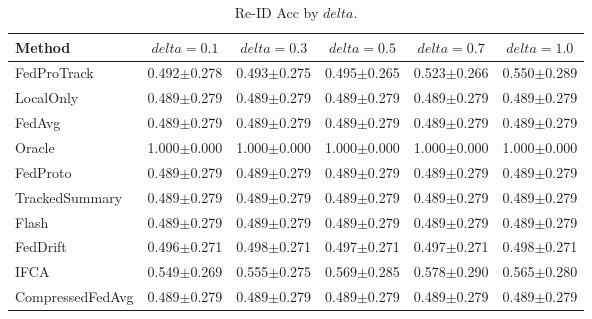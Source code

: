 \begin{table}[t]
\centering
\caption{Re-ID Acc by $delta$.}
\label{tab:delta_concept_re_id_accuracy}
\begin{tabular}{lccccc}
\toprule
Method & $delta=0.1$ & $delta=0.3$ & $delta=0.5$ & $delta=0.7$ & $delta=1.0$ \\
\midrule
FedProTrack & 0.492$\pm$0.278 & 0.493$\pm$0.275 & 0.495$\pm$0.265 & 0.523$\pm$0.266 & 0.550$\pm$0.289 \\
LocalOnly & 0.489$\pm$0.279 & 0.489$\pm$0.279 & 0.489$\pm$0.279 & 0.489$\pm$0.279 & 0.489$\pm$0.279 \\
FedAvg & 0.489$\pm$0.279 & 0.489$\pm$0.279 & 0.489$\pm$0.279 & 0.489$\pm$0.279 & 0.489$\pm$0.279 \\
Oracle & 1.000$\pm$0.000 & 1.000$\pm$0.000 & 1.000$\pm$0.000 & 1.000$\pm$0.000 & 1.000$\pm$0.000 \\
FedProto & 0.489$\pm$0.279 & 0.489$\pm$0.279 & 0.489$\pm$0.279 & 0.489$\pm$0.279 & 0.489$\pm$0.279 \\
TrackedSummary & 0.489$\pm$0.279 & 0.489$\pm$0.279 & 0.489$\pm$0.279 & 0.489$\pm$0.279 & 0.489$\pm$0.279 \\
Flash & 0.489$\pm$0.279 & 0.489$\pm$0.279 & 0.489$\pm$0.279 & 0.489$\pm$0.279 & 0.489$\pm$0.279 \\
FedDrift & 0.496$\pm$0.271 & 0.498$\pm$0.271 & 0.497$\pm$0.271 & 0.497$\pm$0.271 & 0.498$\pm$0.271 \\
IFCA & 0.549$\pm$0.269 & 0.555$\pm$0.275 & 0.569$\pm$0.285 & 0.578$\pm$0.290 & 0.565$\pm$0.280 \\
CompressedFedAvg & 0.489$\pm$0.279 & 0.489$\pm$0.279 & 0.489$\pm$0.279 & 0.489$\pm$0.279 & 0.489$\pm$0.279 \\
\bottomrule
\end{tabular}
\end{table}